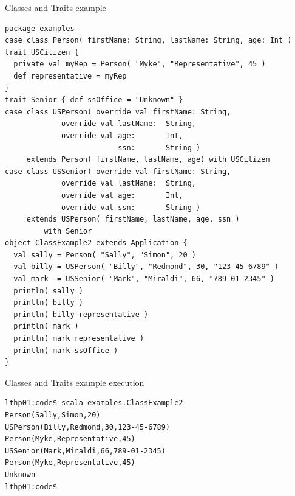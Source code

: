 \documentclass[t]{beamer}
\begin{document}
\begin{frame}[fragile]{Classes and Traits example}
  \begin{tiny}
  \begin{verbatim}
package examples
case class Person( firstName: String, lastName: String, age: Int )
trait USCitizen {
  private val myRep = Person( "Myke", "Representative", 45 )
  def representative = myRep
}
trait Senior { def ssOffice = "Unknown" }
case class USPerson( override val firstName: String,
		     override val lastName:  String,
		     override val age:       Int,
		                  ssn:       String )
     extends Person( firstName, lastName, age) with USCitizen
case class USSenior( override val firstName: String,
		     override val lastName:  String,
		     override val age:       Int,
		     override val ssn:       String ) 
     extends USPerson( firstName, lastName, age, ssn )
         with Senior
object ClassExample2 extends Application {
  val sally = Person( "Sally", "Simon", 20 )
  val billy = USPerson( "Billy", "Redmond", 30, "123-45-6789" )
  val mark  = USSenior( "Mark", "Miraldi", 66, "789-01-2345" )
  println( sally )
  println( billy )
  println( billy representative )
  println( mark )
  println( mark representative )
  println( mark ssOffice )
}
  \end{verbatim}
  \end{tiny}
  \note{}
\end{frame}

\begin{frame}[fragile]{Classes and Traits example execution}
  \begin{tiny}
  \begin{verbatim}
lthp01:code$ scala examples.ClassExample2
Person(Sally,Simon,20)
USPerson(Billy,Redmond,30,123-45-6789)
Person(Myke,Representative,45)
USSenior(Mark,Miraldi,66,789-01-2345)
Person(Myke,Representative,45)
Unknown
lthp01:code$ 
  \end{verbatim}
  \end{tiny}
  \note{}
\end{frame}
\end{document}
